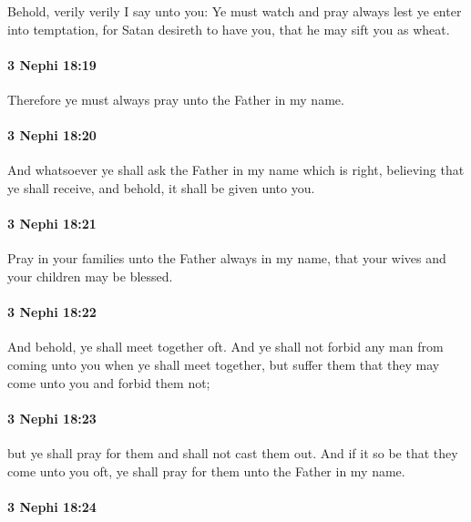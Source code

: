 			Behold, verily verily I say unto you:
			Ye must watch and pray always lest ye enter into temptation,
			for Satan desireth to have you,
			that he may sift you as wheat.

		\paragraph{3 Nephi 18:19} %
			\label{3NEPHI-18-19}

			Therefore ye must always pray unto the Father in my name.

		\paragraph{3 Nephi 18:20} %
			\label{3NEPHI-18-20}

			And whatsoever ye shall ask the Father in my name which is right,
			believing that ye shall receive,
			and behold, it shall be given unto you.

		\paragraph{3 Nephi 18:21} %
			\label{3NEPHI-18-21}

			Pray in your families unto the Father always in my name,
			that your wives and your children may be blessed.

		\paragraph{3 Nephi 18:22} %
			\label{3NEPHI-18-22}

			And behold, ye shall meet together oft.
			And ye shall not forbid any man from coming unto you
			when ye shall meet together,
			but suffer them that they may come unto you and forbid them not;

		\paragraph{3 Nephi 18:23} %
			\label{3NEPHI-18-23}

			but ye shall pray for them and shall not cast them out.
			And if it so be that they come unto you oft,
			ye shall pray for them unto the Father in my name.
			
		\paragraph{3 Nephi 18:24} %
			\label{3NEPHI-18-24}

